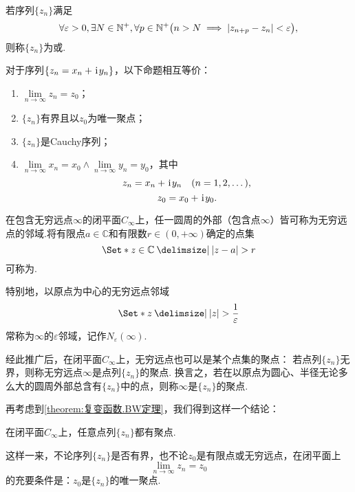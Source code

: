 \begin{definition}
若序列\(\{z_n\}\)满足\[
\forall \varepsilon > 0, \exists N \in \mathbb{N}^+, \forall p\in\mathbb{N}^+ \bigl(
n > N  \implies  \abs{z_{n+p} - z_n} < \varepsilon
\bigr),
\]则称\(\{z_n\}\)为或.
\end{definition}

\begin{theorem}
对于序列\(\{z_n = x_n + \kern1pt\mathrm{i}\kern1pt y_n\}\)，以下命题相互等价：
\begin{enumerate}
\item \(\lim\limits_{n \to \infty} z_n = z_0\)；

\item \(\{z_n\}\)有界且以\(z_0\)为唯一聚点；

\item \(\{z_n\}\)是Cauchy序列；

\item \(\lim\limits_{n \to \infty} x_n = x_0 \land \lim\limits_{n \to \infty} y_n = y_0\)，其中\[
z_n = x_n + \kern1pt\mathrm{i}\kern1pt y_n \quad(n = 1,2,\dotsc),
\]\[
z_0 = x_0 + \kern1pt\mathrm{i}\kern1pt y_0.
\]
\end{enumerate}
\end{theorem}

\begin{definition}
在包含无穷远点\(\infty\)的闭平面\(C_\infty\)上，任一圆周的外部（包含点\(\infty\)）皆可称为无穷远点的邻域.将有限点\(a\in\mathbb{C}\)和有限数\(r\in(0,+\infty)\)确定的点集\[
\Set*{ z\in\mathbb{C} \given \abs{z-a}>r }
\]可称为.

特别地，以原点为中心的无穷远点邻域\[
\Set*{ z \given \abs{z} > \frac{1}{\varepsilon} }
\]常称为\(\infty\)的\(\varepsilon\)邻域，记作\(N_{\varepsilon}(\infty)\).
\end{definition}
经此推广后，在闭平面\(C_\infty\)上，无穷远点也可以是某个点集的聚点：
若点列\(\{z_n\}\)无界，则称无穷远点\(\infty\)是点列\(\{z_n\}\)的聚点.
换言之，若在以原点为圆心、半径无论多么大的圆周外部总含有\(\{z_n\}\)中的点，则称\(\infty\)是\(\{z_n\}\)的聚点.

再考虑到\cref{theorem:复变函数.BW定理}，我们得到这样一个结论：
\begin{theorem}
在闭平面\(C_\infty\)上，任意点列\(\{z_n\}\)都有聚点.
\end{theorem}
这样一来，不论序列\(\{z_n\}\)是否有界，也不论\(z_0\)是有限点或无穷远点，在闭平面上\[
\lim\limits_{n\to\infty} z_n = z_0
\]的充要条件是：\(z_0\)是\(\{z_n\}\)的唯一聚点.


